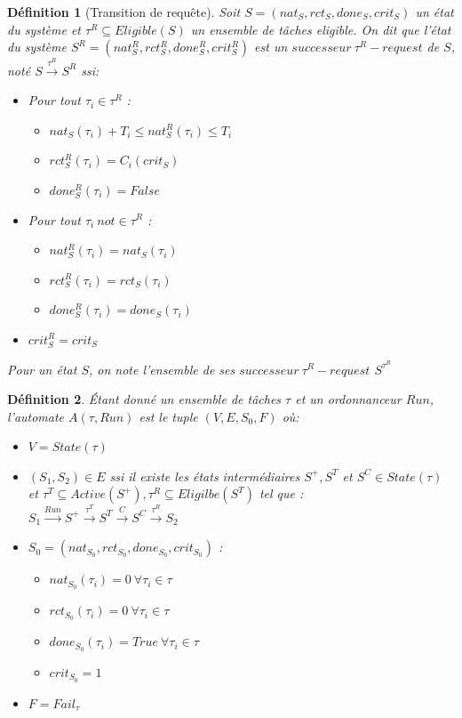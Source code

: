 \documentclass[a4paper]{report}
\theoremstyle{break}
\newtheorem{defin}{Définition}
\theoremstyle{breakplain}
\begin{document}
\begin{defin}[Transition de requête]
\label{treq}
Soit $S = (nat_S, rct_S, done_S, crit_S)$ un état du système et $\tau^R \subseteq Eligible(S)$ un ensemble de tâches eligible. On dit que l'état du système $S^R = (nat_S^R, rct_S^R, done_S^R, crit_S^R)$ est un $successeur\ \tau^R-request$ de $S$, noté $S\xrightarrow{\tau^R}S^R$ ssi:

\begin{itemize}
\item Pour tout $\tau_i \in \tau^R$ :\begin{itemize}
    \item $nat_S(\tau_i)+T_i \leq nat_S^R(\tau_i) \leq T_i$
    \item $rct_S^R(\tau_i)=C_i(crit_S)$
    \item $done_S^R(\tau_i) = False$
\end{itemize}
\item Pour tout $\tau_i\ not \in \tau^R$ :\begin{itemize}
    \item $nat_S^R(\tau_i)=nat_S(\tau_i)$
    \item $rct_S^R(\tau_i)=rct_S(\tau_i)$
    \item $done_S^R(\tau_i) = done_S(\tau_i)$
\end{itemize}
\item $crit_S^R = crit_S$
\end{itemize}

Pour un état $S$, on note l'ensemble de ses $successeur\ \tau^R-request$ $S^{\tau^R}$

\end{defin}

\begin{defin} 
\label{autospo}
Étant donné un ensemble de tâches $\tau$ et un ordonnanceur $Run$, l'automate $A(\tau,Run)$ est le tuple $(V, E, S_0, F)$ où:
\begin{itemize}
\item  $V=State(\tau)$
\item $(S_1,S_2) \in E$ ssi il existe les états intermédiaires $S^{+}, S^{T}$ et $S^{C} \in State(\tau)$ et $\tau^T \subseteq Active(S^{+}),\tau^R \subseteq Eligilbe(S^{T}) $ tel que : \\$S_1\xrightarrow{Run}S^{+}\xrightarrow{\tau^T}S^{T}\xrightarrow{C}S^{C}\xrightarrow{\tau^R}S_2$
\item $S_0 = (nat_{S_0}, rct_{S_0}, done_{S_0}, crit_{S_0})$ :\begin{itemize}
\item $nat_{S_0}(\tau_i) = 0\ \forall \tau_i \in \tau$
\item $rct_{S_0}(\tau_i) = 0\ \forall \tau_i \in \tau$
\item $done_{S_0}(\tau_i) = True\ \forall \tau_i \in \tau$
\item $crit_{S_0} = 1$
\end{itemize}
\item $F = Fail_\tau$
\end{itemize}

\end{defin} 
\end{document}
